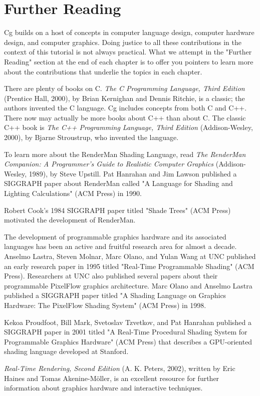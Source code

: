 \documentclass[../main.tex]{subfiles}
\begin{document}
\section{Further Reading}

Cg builds on a host of concepts in computer language design, computer hardware design, and computer graphics. Doing justice to all these contributions in the context of this tutorial is not always practical. What we attempt in the "Further Reading" section at the end of each chapter is to offer you pointers to learn more about the contributions that underlie the topics in each chapter.
\par
There are plenty of books on C. \textit{The C Programming Language, Third Edition} (Prentice Hall, 2000), by Brian Kernighan and Dennis Ritchie, is a classic; the authors invented the C language. Cg includes concepts from both C and C++. There now may actually be more books about C++ than about C. The classic C++ book is \textit{The C++ Programming Language, Third Edition} (Addison-Wesley, 2000), by Bjarne Stroustrup, who invented the language.

To learn more about the RenderMan Shading Language, read \textit{The RenderMan Companion: A Programmer's Guide to Realistic Computer Graphics} (Addison-Wesley, 1989), by Steve Upstill. Pat Hanrahan and Jim Lawson published a SIGGRAPH paper about RenderMan called "A Language for Shading and Lighting Calculations" (ACM Press) in 1990.

Robert Cook's 1984 SIGGRAPH paper titled "Shade Trees" (ACM Press) motivated the development of RenderMan.

The development of programmable graphics hardware and its associated languages has been an active and fruitful research area for almost a decade. Anselmo Lastra, Steven Molnar, Marc Olano, and Yulan Wang at UNC published an early research paper in 1995 titled "Real-Time Programmable Shading" (ACM Press). Researchers at UNC also published several papers about their programmable PixelFlow graphics architecture. Marc Olano and Anselmo Lastra published a SIGGRAPH paper titled "A Shading Language on Graphics Hardware: The PixelFlow Shading System" (ACM Press) in 1998.

Kekoa Proudfoot, Bill Mark, Svetoslav Tzvetkov, and Pat Hanrahan published a SIGGRAPH paper in 2001 titled "A Real-Time Procedural Shading System for Programmable Graphics Hardware" (ACM Press) that describes a GPU-oriented shading language developed at Stanford.

\textit{Real-Time Rendering, Second Edition} (A. K. Peters, 2002), written by Eric Haines and Tomas Akenine-Möller, is an excellent resource for further information about graphics hardware and interactive techniques.
\end{document}
